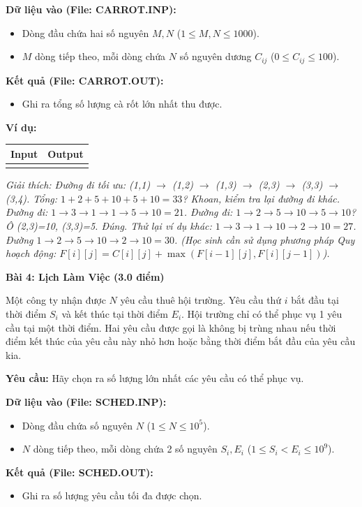 \documentclass[11pt, a4paper]{article}
\newcommand{\bai}[2]{\vspace{0.5cm}\noindent\textbf{Bài #1: #2}}
\newcommand{\iobox}[2]{
    \begin{center}
    \begin{tabularx}{0.8\textwidth}{|X|X|}
    \hline
    \textbf{Input} & \textbf{Output} \\
    \hline
    \vtop{#1} & \vtop{#2} \\
    \hline
    \end{tabularx}
    \end{center}
}
\begin{document}
\textbf{Dữ liệu vào (File: CARROT.INP):}
\begin{itemize}
    \item Dòng đầu chứa hai số nguyên $M, N$ ($1 \le M, N \le 1000$).
    \item $M$ dòng tiếp theo, mỗi dòng chứa $N$ số nguyên dương $C_{ij}$ ($0 \le C_{ij} \le 100$).
\end{itemize}

\textbf{Kết quả (File: CARROT.OUT):}
\begin{itemize}
    \item Ghi ra tổng số lượng cà rốt lớn nhất thu được.
\end{itemize}

\textbf{Ví dụ:}
\iobox{
3 4 \newline
1 2 5 1 \newline
3 1 10 2 \newline
1 1 5 10
}{
29
}
\textit{Giải thích: Đường đi tối ưu: (1,1) $\to$ (1,2) $\to$ (1,3) $\to$ (2,3) $\to$ (3,3) $\to$ (3,4).
Tổng: $1 + 2 + 5 + 10 + 5 + 10 = 33$? Khoan, kiểm tra lại đường đi khác.
Đường đi: $1 \to 3 \to 1 \to 1 \to 5 \to 10 = 21$.
Đường đi: $1 \to 2 \to 5 \to 10 \to 5 \to 10$? Ô (2,3)=10, (3,3)=5. Đúng.
Thử lại ví dụ khác:
$1 \to 3 \to 1 \to 10 \to 2 \to 10 = 27$.
Đường $1 \to 2 \to 5 \to 10 \to 2 \to 10 = 30$.
(Học sinh cần sử dụng phương pháp Quy hoạch động: $F[i][j] = C[i][j] + \max(F[i-1][j], F[i][j-1])$).}

\bai{4}{Lịch Làm Việc (3.0 điểm)}

Một công ty nhận được $N$ yêu cầu thuê hội trường. Yêu cầu thứ $i$ bắt đầu tại thời điểm $S_i$ và kết thúc tại thời điểm $E_i$. Hội trường chỉ có thể phục vụ 1 yêu cầu tại một thời điểm. Hai yêu cầu được gọi là không bị trùng nhau nếu thời điểm kết thúc của yêu cầu này nhỏ hơn hoặc bằng thời điểm bắt đầu của yêu cầu kia.

\textbf{Yêu cầu:} Hãy chọn ra số lượng lớn nhất các yêu cầu có thể phục vụ.

\textbf{Dữ liệu vào (File: SCHED.INP):}
\begin{itemize}
    \item Dòng đầu chứa số nguyên $N$ ($1 \le N \le 10^5$).
    \item $N$ dòng tiếp theo, mỗi dòng chứa 2 số nguyên $S_i, E_i$ ($1 \le S_i < E_i \le 10^9$).
\end{itemize}

\textbf{Kết quả (File: SCHED.OUT):}
\begin{itemize}
    \item Ghi ra số lượng yêu cầu tối đa được chọn.
\end{itemize}
\end{document}
